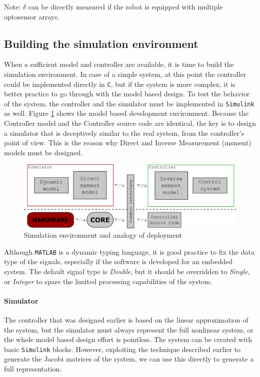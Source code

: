 Note: $\delta$ can be directly measured if the robot is equipped with multiple optosensor arrays.

\subsection{Building the simulation environment}

When a sufficient model and controller are available, it is time to build the simulation environment. In case of a simple system, at this point the controller could be implemented directly in \verb!C!, but if the system is more complex, it is better practice to go through with the model based design. To test the behavior of the system, the controller and the simulator must be implemented in \verb!Simulink! as well. Figure \ref{fig:simenvironment} shows the model based development environment. Because the Controller model and the Controller source code are identical, the key is to design a simulator that is deceptively similar to the real system, from the controller's point of view. This is the reason why Direct and Inverse Measurement (msment) models must be designed.

\begin{figure}[!ht]
    \centering
    \includegraphics[width=\linewidth]{img/simenvironment}
    \centering
    \caption{Simulation environment and analogy of deployment}
    \label{fig:simenvironment}
\end{figure}

Although \verb!MATLAB! is a dynamic typing language, it is good practice to fix the data type of the signals, especially if the software is developed for an embedded system. The default signal type is \emph{Double}, but it should be overridden to \emph{Single}, or \emph{Integer} to spare the limited processing capabilities of the system.

\paragraph{Simulator}

The controller that was designed earlier is based on the linear approximation of the system, but the simulator must always represent the full nonlinear system, or the whole model based design effort is pointless. The system can be created with basic \verb!Simulink! blocks. However, exploiting the technique described earlier to generate the Jacobi matrices of the system, we can use this directly to generate a full representation.

